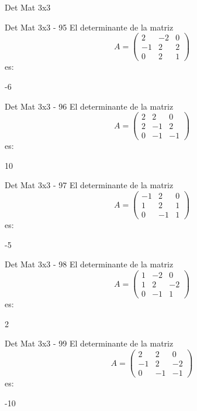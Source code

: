 \documentclass[a4,11pt]{aleph-notas}
\begin{document}
\begin{quiz}{Det Mat 3x3}
\begin{numerical}[tolerance=0]%
    {Det Mat 3x3 - 95}
    El determinante de la matriz
    \[
        A = \begin{pmatrix} 2 & -2 & 0 \\ -1 & 2 & 2 \\ 0 & 2 & 1 \end{pmatrix}
    \]
    es:
    \item[] -6
\end{numerical}

\begin{numerical}[tolerance=0]%
    {Det Mat 3x3 - 96}
    El determinante de la matriz
    \[
        A = \begin{pmatrix} 2 & 2 & 0 \\ 2 & -1 & 2 \\ 0 & -1 & -1 \end{pmatrix}
    \]
    es:
    \item[] 10
\end{numerical}

\begin{numerical}[tolerance=0]%
    {Det Mat 3x3 - 97}
    El determinante de la matriz
    \[
        A = \begin{pmatrix} -1 & 2 & 0 \\ 1 & 2 & 1 \\ 0 & -1 & 1 \end{pmatrix}
    \]
    es:
    \item[] -5
\end{numerical}

\begin{numerical}[tolerance=0]%
    {Det Mat 3x3 - 98}
    El determinante de la matriz
    \[
        A = \begin{pmatrix} 1 & -2 & 0 \\ 1 & 2 & -2 \\ 0 & -1 & 1 \end{pmatrix}
    \]
    es:
    \item[] 2
\end{numerical}

\begin{numerical}[tolerance=0]%
    {Det Mat 3x3 - 99}
    El determinante de la matriz
    \[
        A = \begin{pmatrix} 2 & 2 & 0 \\ -1 & 2 & -2 \\ 0 & -1 & -1 \end{pmatrix}
    \]
    es:
    \item[] -10
\end{numerical}


\end{quiz}
\end{document}
